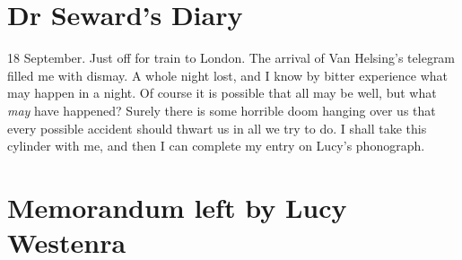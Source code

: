 \section{Dr Seward's Diary}

\begin{diary}{18 September.}
Just off for train to London. The arrival of Van Helsing's telegram filled me with dismay. A whole night lost, and I know by bitter experience what may happen in a night. Of course it is possible that all may be well, but what \textit{may} have happened? Surely there is some horrible doom hanging over us that every possible accident should thwart us in all we try to do. I shall take this cylinder with me, and then I can complete my entry on Lucy's phonograph.
\end{diary}

\section{Memorandum left by Lucy Westenra}

